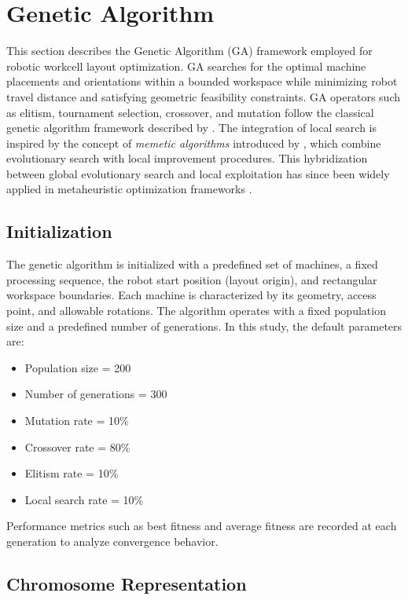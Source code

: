 \documentclass{article}
\begin{document}
\newpage
\section{Genetic Algorithm}

This section describes the Genetic Algorithm (GA) framework employed for robotic workcell layout optimization. GA searches for the optimal machine placements and orientations within a bounded workspace while minimizing robot travel distance and satisfying geometric feasibility constraints. GA operators such as elitism, tournament selection, crossover, and mutation
follow the classical genetic algorithm framework described by
\textcite{goldberg1989genetic}. The integration of local search is inspired by the concept of \textit{memetic algorithms} introduced by
\textcite{moscato1989memetic}, which combine evolutionary search with local improvement procedures. This hybridization between global evolutionary search and local exploitation has since been widely applied in metaheuristic optimization frameworks \parencite{talbi2009metaheuristics}.

\subsection{Initialization}

The genetic algorithm is initialized with a predefined set of machines, a fixed processing sequence, the robot start position (layout origin), and rectangular workspace boundaries. Each machine is characterized by its geometry, access point, and allowable rotations. The algorithm operates with a fixed population size and a predefined number of generations. In this study, the default parameters are:
\begin{itemize}
    \item Population size = 200
    \item Number of generations = 300
    \item Mutation rate = 10\%
    \item Crossover rate = 80\%
    \item Elitism rate = 10\%
    \item Local search rate = 10\%
\end{itemize}

Performance metrics such as best fitness and average fitness are recorded at each generation to analyze convergence behavior.

\subsection{Chromosome Representation}
\end{document}
